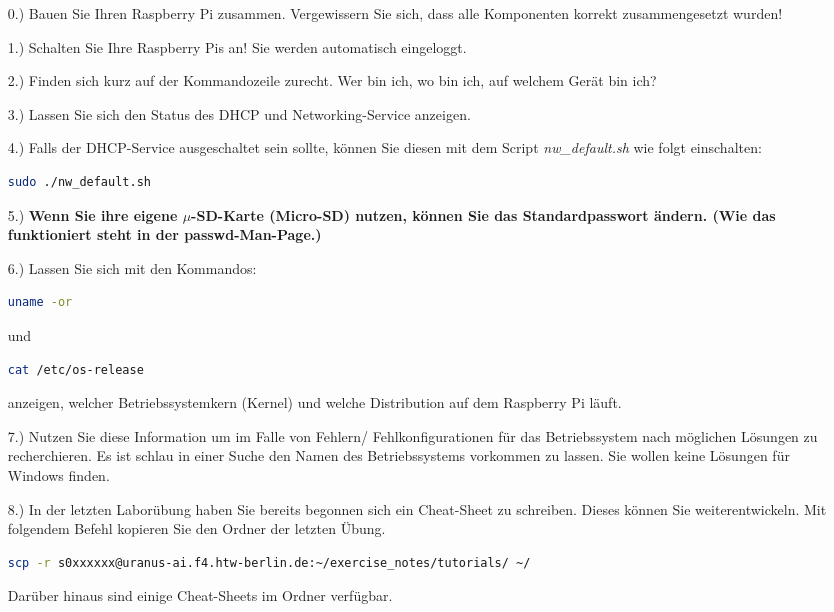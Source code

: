 \documentclass[paper=a4,fontsize=11pt]{scrartcl}%
\numberwithin{equation}{section}
\begin{document}
\begin{itemize}
	\item[0.)] Bauen Sie Ihren Raspberry Pi zusammen. Vergewissern Sie sich, dass alle Komponenten korrekt zusammengesetzt wurden!
	\item[1.)] Schalten Sie Ihre Raspberry Pis an! Sie werden automatisch eingeloggt.
	\item[2.)] Finden sich kurz auf der Kommandozeile zurecht. \glqq Wer bin ich, wo bin ich, auf welchem Gerät bin ich?\grqq
	\item[3.)] Lassen Sie sich den Status des DHCP und Networking-Service anzeigen.
	\item[4.)] Falls der DHCP-Service ausgeschaltet sein sollte, können Sie diesen mit dem Script \emph{nw\_default.sh} wie folgt einschalten:
	\begin{lstlisting}[style=Bash, language=Bash]
sudo ./nw_default.sh
		\end{lstlisting}	
	\item[5.)] \textbf{Wenn Sie ihre eigene $\mu$-SD-Karte (Micro-SD) nutzen, können Sie das Standardpasswort ändern. (Wie das funktioniert steht in der passwd-Man-Page.)}
	\item[6.)] Lassen Sie sich mit den Kommandos:
			\begin{lstlisting}[style=Bash, language=Bash]
uname -or
		\end{lstlisting} und
				\begin{lstlisting}[style=Bash, language=Bash]
cat /etc/os-release
		\end{lstlisting} anzeigen, welcher Betriebssystemkern (Kernel) und welche Distribution auf dem Raspberry Pi läuft.
	\item[7.)] Nutzen Sie diese Information um im Falle von Fehlern/ Fehlkonfigurationen für das Betriebssystem nach möglichen Lösungen zu recherchieren. Es ist schlau in einer Suche den Namen des Betriebssystems vorkommen zu lassen. Sie wollen keine Lösungen für Windows finden.
	\item[8.)] In der letzten Laborübung haben Sie bereits begonnen sich ein Cheat-Sheet zu schreiben. Dieses können Sie weiterentwickeln. Mit folgendem Befehl kopieren Sie den Ordner der letzten Übung. 
	\begin{lstlisting}[style=Bash, language=Bash]
scp -r s0xxxxxx@uranus-ai.f4.htw-berlin.de:~/exercise_notes/tutorials/ ~/
		\end{lstlisting}
		Darüber hinaus sind einige Cheat-Sheets im Ordner  verfügbar.
\end{itemize}
	
\end{document}
